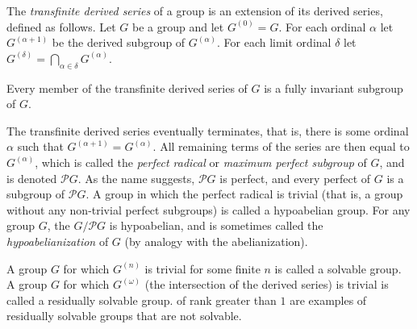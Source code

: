 \documentclass[12pt]{article}
\def\P#1{\mathcal{P}{#1}}
\begin{document}

The \emph{transfinite derived series} of a group is 
an extension of its derived series, defined as follows.
Let $G$ be a group and let $G^{(0)}=G$.
For each ordinal $\alpha$ 
let $G^{(\alpha+1)}$ be the derived subgroup of $G^{(\alpha)}$.
For each limit ordinal $\delta$ 
let $G^{(\delta)}=\bigcap_{\alpha\in\delta}G^{(\alpha)}$.

Every member of the transfinite derived series of $G$ 
is a fully invariant subgroup of $G$.

The transfinite derived series eventually terminates, that is, 
there is some ordinal $\alpha$ such that $G^{(\alpha+1)}=G^{(\alpha)}$.
All remaining terms of the series are then equal to $G^{(\alpha)}$,
which is called the \emph{perfect radical} or \emph{maximum perfect subgroup}
of $G$, and is denoted $\P{G}$.
As the name suggests, $\P{G}$ is perfect, 
and every perfect  of $G$ is a subgroup of $\P{G}$.
A group in which the perfect radical is trivial 
(that is, a group without any non-trivial perfect subgroups)
is called a hypoabelian group.
For any group $G$, the  $G/\P{G}$
is hypoabelian, and is sometimes called the \emph{hypoabelianization} of $G$
(by analogy with the abelianization).

A group $G$ for which $G^{(n)}$ is trivial for some finite $n$ 
is called a solvable group.
A group $G$ for which $G^{(\omega)}$ (the intersection of the derived series)
is trivial is called a residually solvable group.
 of rank greater than $1$
are examples of residually solvable groups that are not solvable.
\end{document}
